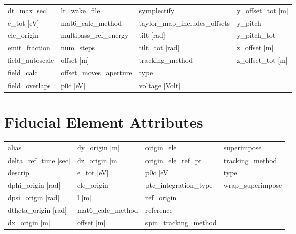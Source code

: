 \begin{tabular}{llll}
dt_max [sec]                     & lr_wake_file                     & symplectify                      & y_offset_tot [m]                 \\
e_tot [eV]                       & mat6_calc_method                 & taylor_map_includes_offsets      & y_pitch                          \\
ele_origin                       & multipass_ref_energy             & tilt [rad]                       & y_pitch_tot                      \\
emit_fraction                    & num_steps                        & tilt_tot [rad]                   & z_offset [m]                     \\
field_autoscale                  & offset [m]                       & tracking_method                  & z_offset_tot [m]                 \\
field_calc                       & offset_moves_aperture            & type                             &                                  \\
field_overlaps                   & p0c [eV]                         & voltage [Volt]                   &                                  \\
 \bottomrule
 \end{tabular}
 \vfill
 
 \section{Fiducial Element Attributes}
 \label{s:list.fiducial}
 
 \begin{tabular}{llll} \toprule
alias                            & dy_origin [m]                    & origin_ele                       & superimpose                      \\
delta_ref_time [sec]             & dz_origin [m]                    & origin_ele_ref_pt                & tracking_method                  \\
descrip                          & e_tot [eV]                       & p0c [eV]                         & type                             \\
dphi_origin [rad]                & ele_origin                       & ptc_integration_type             & wrap_superimpose                 \\
dpsi_origin [rad]                & l [m]                            & ref_origin                       &                                  \\
dtheta_origin [rad]              & mat6_calc_method                 & reference                        &                                  \\
dx_origin [m]                    & offset [m]                       & spin_tracking_method             &                                  \\
 \bottomrule
 \end{tabular}
 \vfill
 
